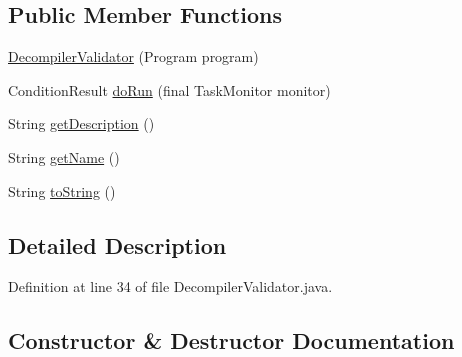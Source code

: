 \subsection*{Public Member Functions}
\begin{DoxyCompactItemize}
\item 
\mbox{\hyperlink{classghidra_1_1app_1_1plugin_1_1core_1_1decompiler_1_1validator_1_1_decompiler_validator_a28110443ec40df6f71d832c1c0a75c6e}{Decompiler\+Validator}} (Program program)
\item 
Condition\+Result \mbox{\hyperlink{classghidra_1_1app_1_1plugin_1_1core_1_1decompiler_1_1validator_1_1_decompiler_validator_a687a9538377586845a9fc2e230ddf325}{do\+Run}} (final Task\+Monitor monitor)
\item 
String \mbox{\hyperlink{classghidra_1_1app_1_1plugin_1_1core_1_1decompiler_1_1validator_1_1_decompiler_validator_aaa8c4be55b0938c09410ec1d1c7d6f60}{get\+Description}} ()
\item 
String \mbox{\hyperlink{classghidra_1_1app_1_1plugin_1_1core_1_1decompiler_1_1validator_1_1_decompiler_validator_a0f9aea6b7004ec347e3b92d3be172f1a}{get\+Name}} ()
\item 
String \mbox{\hyperlink{classghidra_1_1app_1_1plugin_1_1core_1_1decompiler_1_1validator_1_1_decompiler_validator_a6f5f4f64b44aeb756ed050b65834c02e}{to\+String}} ()
\end{DoxyCompactItemize}


\subsection{Detailed Description}


Definition at line 34 of file Decompiler\+Validator.\+java.



\subsection{Constructor \& Destructor Documentation}
\mbox{\label{classghidra_1_1app_1_1plugin_1_1core_1_1decompiler_1_1validator_1_1_decompiler_validator_a28110443ec40df6f71d832c1c0a75c6e}} 
